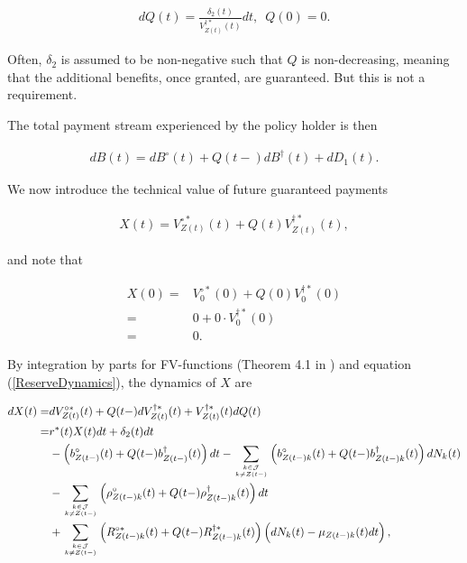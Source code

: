\documentclass{book}
\newcommand{\1}[1]{\mathbbm{1}_{\left\lbrace #1 \right\rbrace}}
\theoremstyle{break}
\theoremstyle{remark}
\numberwithin{equation}{section}
\begin{document}
\begin{align} \label{QDynamics}
dQ(t) = \frac{\delta_2(t)}{V_{Z(t)}^{\dagger*}(t)}  dt, \, \, \, Q(0)=0.
\end{align}

Often, $\delta_2$ is assumed to be non-negative such that $Q$ is non-decreasing, meaning that the additional benefits, once granted, are guaranteed. But this is not a requirement.

The total payment stream experienced by the policy holder is then

\begin{align} \label{WithProfitTotalBenefits}
dB(t) = dB^\circ(t) + Q(t-) dB^\dagger(t) + dD_1(t).
\end{align}

We now introduce the technical value of future guaranteed payments

\begin{align*}
X(t) = V_{Z(t)}^{\circ*}(t) + Q(t) V_{Z(t)}^{\dagger*}(t),
\end{align*}

and note that 

\begin{align*}
X(0) =& V_{0}^{\circ*}(0) + Q(0) V_{0}^{\dagger*}(0) \\
=& 0 + 0 \cdot V_{0}^{\dagger*}(0) \\
=& 0.
\end{align*}

By integration by parts for FV-functions (Theorem 4.1 in \cite{LivStok}) and equation (\ref{ReserveDynamics}), the dynamics of $X$ are

\begin{align} \label{XDynamics}
\begin{split}
dX(t) =& dV_{Z(t)}^{\circ*}(t) + Q(t-) dV_{Z(t)}^{\dagger*}(t) + V_{Z(t)}^{\dagger*}(t) dQ(t) \\
=& r^*(t) X(t) dt + \delta_2(t)dt \\
&- \left( b_{Z(t-)}^\circ(t) + Q(t-) b_{Z(t-)}^\dagger(t) \right) dt - \sum_{k \in \mathcal{J} \atop k \neq Z(t-)} \left( b_{Z(t-)k}^\circ(t) + Q(t-) b_{Z(t-)k}^\dagger(t)\right) dN_k(t) \\
&- \sum_{k \in \mathcal{J} \atop k \neq Z(t-)} \left( \rho_{Z(t-)k}^\circ(t) + Q(t-) \rho_{Z(t-)k}^\dagger(t) \right) dt \\
&+ \sum_{k \in \mathcal{J} \atop k \neq Z(t-)} \left( R_{Z(t-)k}^{\circ*}(t) + Q(t-) R_{Z(t-)k}^{\dagger*}(t) \right) \left( dN_k(t) - \mu_{Z(t-)k}(t) dt \right),
\end{split}
\end{align}
\end{document}

